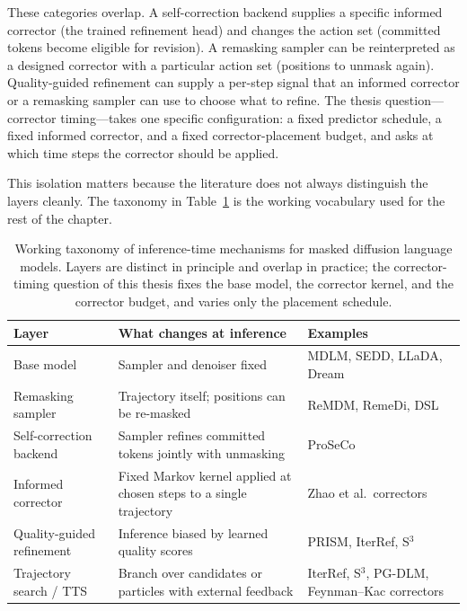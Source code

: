 These categories overlap. A self-correction backend supplies a specific
informed corrector (the trained refinement head) and changes the action set
(committed tokens become eligible for revision). A remasking sampler can
be reinterpreted as a designed corrector with a particular action set
(positions to unmask again). Quality-guided refinement can supply a
per-step signal that an informed corrector or a remasking sampler can use
to choose what to refine. The thesis question---corrector timing---takes
one specific configuration: a fixed predictor schedule, a fixed informed
corrector, and a fixed corrector-placement budget, and asks at which time
steps the corrector should be applied.

This isolation matters because the literature does not always distinguish
the layers cleanly. The taxonomy in Table~\ref{lit:tab:taxonomy} is the
working vocabulary used for the rest of the chapter.

\begin{table}[t]
\centering
\small
\begin{tabular}{p{3.6cm} p{6.2cm} p{4.6cm}}
\toprule
Layer & What changes at inference & Examples \\
\midrule
Base model
  & Sampler and denoiser fixed
  & MDLM, SEDD, LLaDA, Dream \\
Remasking sampler
  & Trajectory itself; positions can be re-masked
  & ReMDM, RemeDi, DSL \\
Self-correction backend
  & Sampler refines committed tokens jointly with unmasking
  & ProSeCo \\
Informed corrector
  & Fixed Markov kernel applied at chosen steps to a single trajectory
  & Zhao et al.\ correctors \\
Quality-guided refinement
  & Inference biased by learned quality scores
  & PRISM, IterRef, S$^3$ \\
Trajectory search / TTS
  & Branch over candidates or particles with external feedback
  & IterRef, S$^3$, PG-DLM, Feynman--Kac correctors \\
\bottomrule
\end{tabular}
\caption{Working taxonomy of inference-time mechanisms for masked diffusion
language models. Layers are distinct in principle and overlap in practice;
the corrector-timing question of this thesis fixes the base model, the
corrector kernel, and the corrector budget, and varies only the placement
schedule.}
\label{lit:tab:taxonomy}
\end{table}


